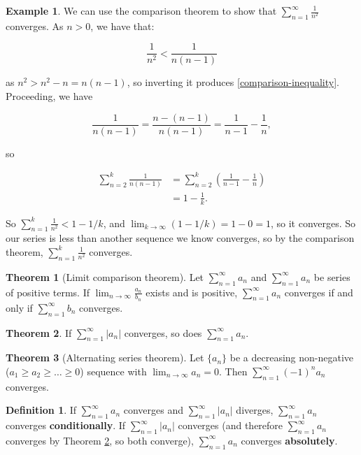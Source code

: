 \documentclass{article}
\theoremstyle{definition}
\newtheorem{definition}{Definition}[section]
\newtheorem{example}{Example}[section]
\newtheorem{theorem}{Theorem}[section]
\begin{document}
\begin{example}
We can use the comparison theorem to show that $\sum\limits_{n=1}^\infty \frac{1}{n^2}$ converges. As $n > 0$, we have that:

\begin{equation}\label{comparison-inequality}
\frac{1}{n^2} < \frac{1}{n(n-1)}
\end{equation}

as $n^2 > n^2 -n = n(n-1)$, so inverting it produces \ref{comparison-inequality}. Proceeding, we have

\begin{equation}
\frac{1}{n(n-1)} = \frac{n - (n-1)}{n(n-1)} = \frac{1}{n-1} - \frac{1}{n},
\end{equation}

so 

\begin{align}
\sum\limits_{n=2}^k \frac{1}{n(n-1)} & = \sum\limits_{n=2}^k \left(\frac{1}{n-1} - \frac{1}{n}\right) \\
& = 1 - \frac{1}{k}.
\end{align}

So $\sum\limits_{n=1}^k \frac{1}{n^2} < 1 - 1/k$, and $\lim_{k \to \infty} (1 - 1/k) = 1 - 0 = 1$, so it converges. So our series is less than another sequence we know converges, so by the comparison theorem, $\sum\limits_{n=1}^k \frac{1}{n^2}$ converges.
\end{example}

\begin{theorem}[Limit comparison theorem]
Let $\sum\limits_{n=1}^\infty a_n$ and $\sum\limits_{n=1}^\infty a_n$ be series of positive terms. If $\lim_{n \to \infty} \frac{a_n}{b_n}$ exists and is positive, $\sum\limits_{n=1}^\infty a_n$ converges if and only if $\sum\limits_{n=1}^\infty b_n$ converges.
\end{theorem}

\begin{theorem} \label{absolute-convergence-theorem}
If $\sum\limits_{n=1}^\infty |a_n|$ converges, so does $\sum\limits_{n=1}^\infty a_n$.
\end{theorem}

\begin{theorem}[Alternating series theorem]
Let $\{a_n\}$ be a decreasing non-negative ($ a_1 \geq a_2 \geq \ldots \geq 0$) sequence with $\lim_{n \to \infty} a_n = 0$. Then $\sum\limits_{n=1}^\infty (-1)^n a_n$ converges.
\end{theorem}

\begin{definition}
If  $\sum\limits_{n=1}^\infty a_n$ converges and  $\sum\limits_{n=1}^\infty |a_n|$ diverges,  $\sum\limits_{n=1}^\infty a_n$ converges \textbf{conditionally}. If  $\sum\limits_{n=1}^\infty |a_n|$ converges (and therefore  $\sum\limits_{n=1}^\infty a_n$ converges by Theorem \ref{absolute-convergence-theorem}, so both converge), $\sum\limits_{n=1}^\infty a_n$ converges \textbf{absolutely}.
\end{definition}
\end{document}
